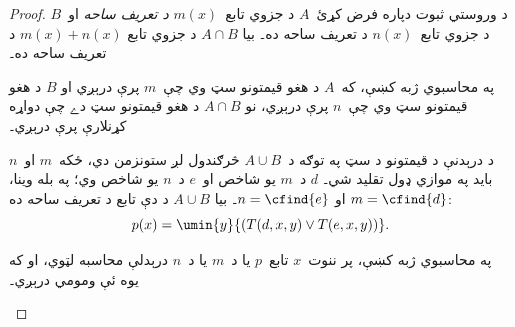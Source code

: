 \documentclass[../../../include/open-logic-section]{subfiles}
\begin{document}
\begin{proof}
د وروستي ثبوت دپاره فرض کړئ~$A$ د جزوي تابع~$m(x)$ \emph{د تعريف
ساحه} او~$B$ د جزوي تابع~$n(x)$ د تعريف ساحه ده۔ بيا $A \cap B$ د
جزوي تابع $m(x) + n(x)$ د تعريف ساحه ده۔

\begin{explain}
په محاسبوي ژبه کښې، که~$A$ د هغو قيمتونو سټ وي چې~$m$ پرې درېږي او
$B$ د هغو قيمتونو سټ وي چې~$n$ پرې درېږي، نو $A \cap B$ د هغو
قيمتونو سټ دے چې دواړه کړنلارې پرې درېږي۔
\end{explain}

د درېدنې د قيمتونو د سټ په توګه د~$A \cup B$ څرګندول لږ ستونزمن دي،
ځکه~$m$ او~$n$ بايد په موازي ډول تقليد شي۔ $d$ د~$m$ يو شاخص او~$e$
د~$n$ يو شاخص وي؛ په بله وينا، $m = \cfind{d}$ او
$n = \cfind{e}$۔ بيا $A \cup B$ د دې تابع د تعريف ساحه ده:
\[
p(x) = \umin{y}{(T(d,x,y) \lor T(e,x,y))}.
\]
\begin{explain}
په محاسبوي ژبه کښې، پر ننوت~$x$ تابع~$p$ يا د~$m$ يا د~$n$ درېدلې
محاسبه لټوي، او که يوه ئې ومومي درېږي۔
\end{explain}
\end{proof}
\end{document}
